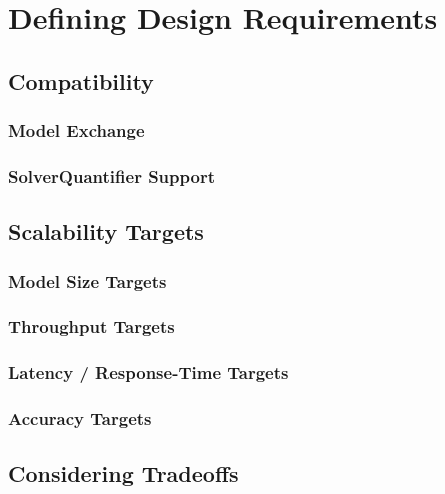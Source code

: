 \chapter{Defining Design Requirements}
\section{Compatibility}
\subsection{Model Exchange}
\subsection{Solver\/Quantifier Support}
\section{Scalability Targets}
\subsection{Model Size Targets}
\subsection{Throughput Targets}
\subsection{Latency / Response-Time Targets}
\subsection{Accuracy Targets}
\section{Considering Tradeoffs}